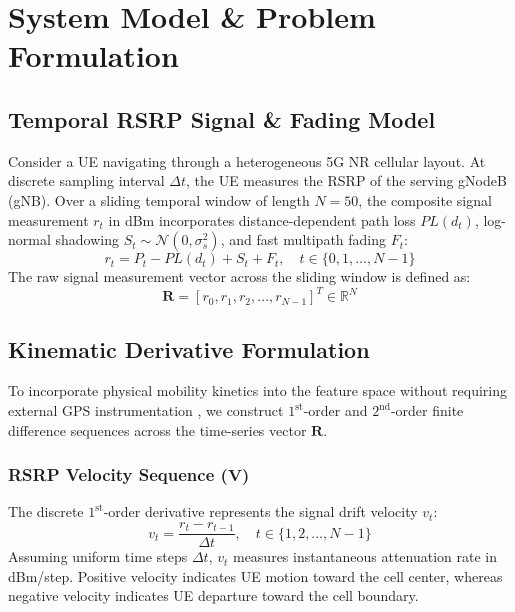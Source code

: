 \documentclass[conference]{IEEEtran}
\begin{document}
\section{System Model \& Problem Formulation}
\label{sec:system_model}

\subsection{Temporal RSRP Signal \& Fading Model}
Consider a UE navigating through a heterogeneous 5G NR cellular layout. At discrete sampling interval $\Delta t$, the UE measures the RSRP of the serving gNodeB (gNB). Over a sliding temporal window of length $N = 50$, the composite signal measurement $r_t$ in dBm incorporates distance-dependent path loss $PL(d_t)$, log-normal shadowing $S_t \sim \mathcal{N}(0, \sigma_s^2)$, and fast multipath fading $F_t$:
\begin{equation}
r_t = P_t - PL(d_t) + S_t + F_t, \quad t \in \{0, 1, \dots, N-1\}
\end{equation}
The raw signal measurement vector across the sliding window is defined as:
\begin{equation}
\mathbf{R} = [r_0, r_1, r_2, \dots, r_{N-1}]^T \in \mathbb{R}^{N}
\end{equation}

\subsection{Kinematic Derivative Formulation}
To incorporate physical mobility kinetics into the feature space without requiring external GPS instrumentation \cite{physics_ml_zhang, kinematic_fading_wang}, we construct $1^{\text{st}}$-order and $2^{\text{nd}}$-order finite difference sequences across the time-series vector $\mathbf{R}$.

\subsubsection{RSRP Velocity Sequence ($\mathbf{V}$)}
The discrete $1^{\text{st}}$-order derivative represents the signal drift velocity $v_t$:
\begin{equation}
v_t = \frac{r_t - r_{t-1}}{\Delta t}, \quad t \in \{1, 2, \dots, N-1\}
\end{equation}
Assuming uniform time steps $\Delta t$, $v_t$ measures instantaneous attenuation rate in dBm/step. Positive velocity indicates UE motion toward the cell center, whereas negative velocity indicates UE departure toward the cell boundary.
\end{document}
